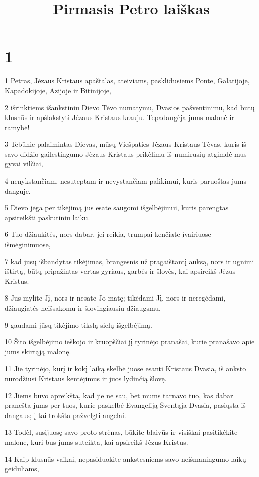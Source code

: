 

\title{Pirmasis Petro laiškas}


\chapter{1}


\par 1 Petras, Jėzaus Kristaus apaštalas, ateiviams, pasklidusiems Ponte, Galatijoje, Kapadokijoje, Azijoje ir Bitinijoje, 
\par 2 išrinktiems išankstiniu Dievo Tėvo numatymu, Dvasios pašventinimu, kad būtų klusnūs ir apšlakstyti Jėzaus Kristaus krauju. Tepadaugėja jums malonė ir ramybė! 
\par 3 Tebūnie palaimintas Dievas, mūsų Viešpaties Jėzaus Kristaus Tėvas, kuris iš savo didžio gailestingumo Jėzaus Kristaus prikėlimu iš numirusių atgimdė mus gyvai vilčiai, 
\par 4 nenykstančiam, nesuteptam ir nevystančiam palikimui, kuris paruoštas jums danguje. 
\par 5 Dievo jėga per tikėjimą jūs esate saugomi išgelbėjimui, kuris parengtas apsireikšti paskutiniu laiku. 
\par 6 Tuo džiaukitės, nors dabar, jei reikia, trumpai kenčiate įvairiuose išmėginimuose, 
\par 7 kad jūsų išbandytas tikėjimas, brangesnis už pragaištantį auksą, nors ir ugnimi ištirtą, būtų pripažintas vertas gyriaus, garbės ir šlovės, kai apsireikš Jėzus Kristus. 
\par 8 Jūs mylite Jį, nors ir nesate Jo matę; tikėdami Jį, nors ir neregėdami, džiaugiatės neišsakomu ir šlovingiausiu džiaugsmu, 
\par 9 gaudami jūsų tikėjimo tikslą­ sielų išgelbėjimą. 
\par 10 Šito išgelbėjimo ieškojo ir kruopščiai jį tyrinėjo pranašai, kurie pranašavo apie jums skirtąją malonę. 
\par 11 Jie tyrinėjo, kurį ir kokį laiką skelbė juose esanti Kristaus Dvasia, iš anksto nurodžiusi Kristaus kentėjimus ir juos lydinčią šlovę. 
\par 12 Jiems buvo apreikšta, kad jie ne sau, bet mums tarnavo tuo, kas dabar pranešta jums per tuos, kurie paskelbė Evangeliją Šventąja Dvasia, pasiųsta iš dangaus; į tai trokšta pažvelgti angelai. 
\par 13 Todėl, susijuosę savo proto strėnas, būkite blaivūs ir visiškai pasitikėkite malone, kuri bus jums suteikta, kai apsireikš Jėzus Kristus. 
\par 14 Kaip klusnūs vaikai, nepasiduokite ankstesniems savo neišmaningumo laikų geiduliams, 
